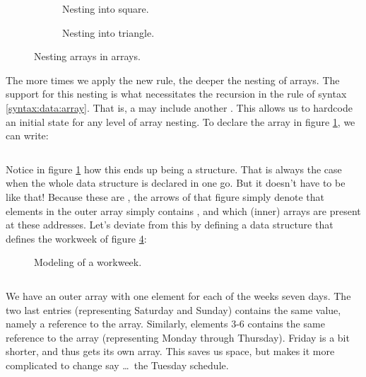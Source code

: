 \begin{figure}[tbp]
  \begin{subfigure}[b]{0.45\textwidth}
    
    \caption{Nesting into square.}
    \label{fig:data:array:nest:square}
  \end{subfigure}
  \hfill
  \begin{subfigure}[b]{0.45\textwidth}
    
    \caption{Nesting into triangle.}
    \label{fig:data:array:nest:triangle}
  \end{subfigure}
  \caption{Nesting arrays in arrays.}
  \label{fig:data:array:nest}
\end{figure}

The more times we apply the new  rule, the deeper the nesting of arrays. The support for this nesting is what necessitates the recursion in the  rule of syntax \ref{syntax:data:array}. That is, a  may include another . This allows us to hardcode an initial state for any level of array nesting. To declare the array in figure \ref{fig:data:array:nest:square}, we can write:

\inputminted[]{csharp}{../src/csharp/primdata/array_nest_square/Program.cs}

Notice in figure \ref{fig:data:array:nest:square} how this ends up being a  structure. That is always the case when the whole data structure is declared in one go. But it doesn't have to be like that! Because these are , the arrows of that figure simply denote that elements in the outer array simply contains , and which (inner) arrays are present at these addresses. Let's deviate from this by defining a data structure that defines the workweek of figure \ref{fig:data:array:nest:workweek}:

\begin{figure}[tbp]
  
  \caption{Modeling of a workweek.}
  \label{fig:data:array:nest:workweek}
\end{figure}

\inputminted[fontsize=\footnotesize]{csharp}{../src/csharp/primdata/array_nest_workweek/Program.cs}

We have an outer array with one element for each of the weeks seven days. The two last entries (representing Saturday and Sunday) contains the same value, namely a reference to the  array. Similarly, elements 3-6 contains the same reference to the  array (representing Monday through Thursday). Friday is a bit shorter, and thus gets its own array. This saves us space, but makes it more complicated to change say \ldots\ the Tuesday schedule.

